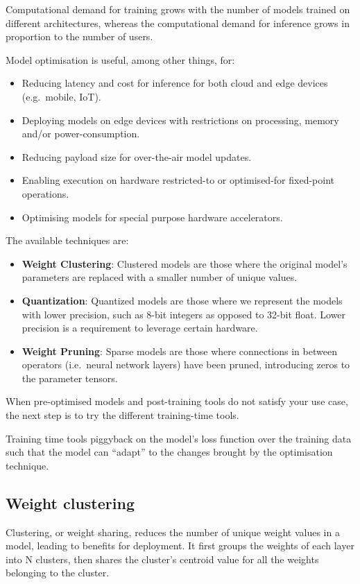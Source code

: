Computational demand for training grows with the number of models trained on
different architectures, whereas the computational demand for inference grows
in proportion to the number of users.

Model optimisation is useful, among other things, for:

\begin{itemize}
    \item Reducing latency and cost for inference for both cloud and edge
        devices (e.g.\ mobile, IoT).
    \item Deploying models on edge devices with restrictions on processing,
        memory and/or power-consumption.
    \item Reducing payload size for over-the-air model updates.
    \item Enabling execution on hardware restricted-to or optimised-for
        fixed-point operations.
    \item Optimising models for special purpose hardware accelerators.
\end{itemize}

The available techniques are:

\begin{itemize}
    \item \textbf{Weight Clustering}: Clustered models are those where the
        original model's parameters are replaced with a smaller number of
        unique values.
    \item \textbf{Quantization}: Quantized models are those where we represent
        the models with lower precision, such as 8-bit integers as opposed to
        32-bit float. Lower precision is a requirement to leverage certain
        hardware.
    \item \textbf{Weight Pruning}: Sparse models are those where connections in
        between operators (i.e.\ neural network layers) have been pruned,
        introducing zeros to the parameter tensors.
\end{itemize}

When pre-optimised models and post-training tools do not satisfy your use case,
the next step is to try the different training-time tools.

Training time tools piggyback on the model's loss function over the training
data such that the model can ``adapt'' to the changes brought by the
optimisation technique.~\cite{tfmot:intro}

\subsection{Weight clustering}
Clustering, or weight sharing, reduces the number of unique weight values in a
model, leading to benefits for deployment. It first groups the weights of each
layer into N clusters, then shares the cluster's centroid value for all the
weights belonging to the cluster.

